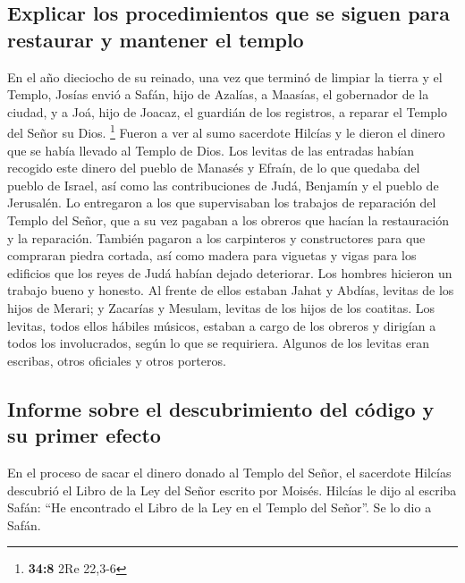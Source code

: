 \hypertarget{explicar-los-procedimientos-que-se-siguen-para-restaurar-y-mantener-el-templo}{%
\subsection{Explicar los procedimientos que se siguen para restaurar y
mantener el
templo}\label{explicar-los-procedimientos-que-se-siguen-para-restaurar-y-mantener-el-templo}}

 En el año dieciocho de su reinado, una vez que terminó de
limpiar la tierra y el Templo, Josías envió a Safán, hijo de Azalías, a
Maasías, el gobernador de la ciudad, y a Joá, hijo de Joacaz, el
guardián de los registros, a reparar el Templo del Señor su Dios.
\footnote{\textbf{34:8} 2Re 22,3-6}  Fueron a ver al sumo
sacerdote Hilcías y le dieron el dinero que se había llevado al Templo
de Dios. Los levitas de las entradas habían recogido este dinero del
pueblo de Manasés y Efraín, de lo que quedaba del pueblo de Israel, así
como las contribuciones de Judá, Benjamín y el pueblo de Jerusalén.
 Lo entregaron a los que supervisaban los trabajos de
reparación del Templo del Señor, que a su vez pagaban a los obreros que
hacían la restauración y la reparación.  También pagaron
a los carpinteros y constructores para que compraran piedra cortada, así
como madera para viguetas y vigas para los edificios que los reyes de
Judá habían dejado deteriorar.  Los hombres hicieron un
trabajo bueno y honesto. Al frente de ellos estaban Jahat y Abdías,
levitas de los hijos de Merari; y Zacarías y Mesulam, levitas de los
hijos de los coatitas. Los levitas, todos ellos hábiles músicos,
 estaban a cargo de los obreros y dirigían a todos los
involucrados, según lo que se requiriera. Algunos de los levitas eran
escribas, otros oficiales y otros porteros.

\hypertarget{informe-sobre-el-descubrimiento-del-cuxf3digo-y-su-primer-efecto}{%
\subsection{Informe sobre el descubrimiento del código y su primer
efecto}\label{informe-sobre-el-descubrimiento-del-cuxf3digo-y-su-primer-efecto}}

 En el proceso de sacar el dinero donado al Templo del
Señor, el sacerdote Hilcías descubrió el Libro de la Ley del Señor
escrito por Moisés.  Hilcías le dijo al escriba Safán:
``He encontrado el Libro de la Ley en el Templo del Señor''. Se lo dio a
Safán.


